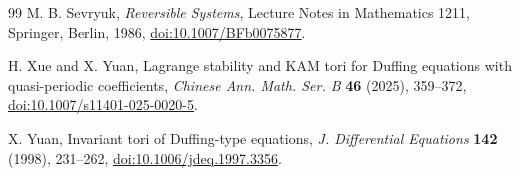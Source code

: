 \documentclass[11pt]{amsart}
\theoremstyle{remark}
\begin{document}
\begin{thebibliography}{99}
M. B. Sevryuk,
\emph{Reversible Systems}, Lecture Notes in Mathematics 1211,
Springer, Berlin, 1986,
\href{https://doi.org/10.1007/BFb0075877}{doi:10.1007/BFb0075877}.

H. Xue and X. Yuan,
Lagrange stability and KAM tori for Duffing equations with quasi-periodic
coefficients,
\emph{Chinese Ann. Math. Ser. B} \textbf{46} (2025), 359--372,
\href{https://doi.org/10.1007/s11401-025-0020-5}
{doi:10.1007/s11401-025-0020-5}.

X. Yuan,
Invariant tori of Duffing-type equations,
\emph{J. Differential Equations} \textbf{142} (1998), 231--262,
\href{https://doi.org/10.1006/jdeq.1997.3356}
{doi:10.1006/jdeq.1997.3356}.
\end{thebibliography}
\end{document}
